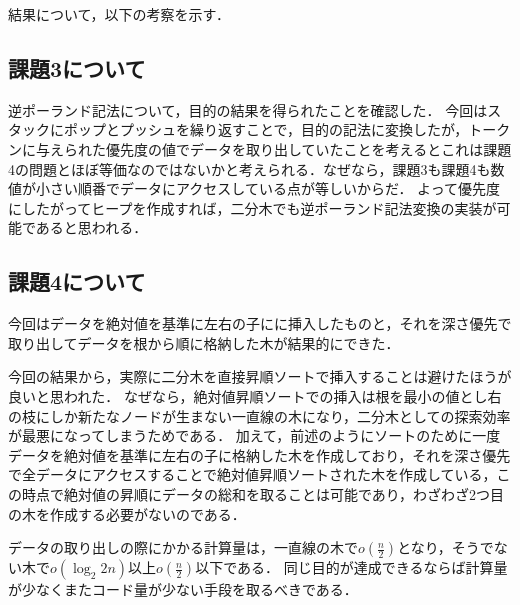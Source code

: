 結果について，以下の考察を示す．

\subsection{課題3について}
逆ポーランド記法について，目的の結果を得られたことを確認した．
今回はスタックにポップとプッシュを繰り返すことで，目的の記法に変換したが，トークンに与えられた優先度の値でデータを取り出していたことを考えるとこれは課題4の問題とほぼ等価なのではないかと考えられる．なぜなら，課題3も課題4も数値が小さい順番でデータにアクセスしている点が等しいからだ．
よって優先度にしたがってヒープを作成すれば，二分木でも逆ポーランド記法変換の実装が可能であると思われる．

\subsection{課題4について}

今回はデータを絶対値を基準に左右の子にに挿入したものと，それを深さ優先で取り出してデータを根から順に格納した木が結果的にできた．

今回の結果から，実際に二分木を直接昇順ソートで挿入することは避けたほうが良いと思われた．
なぜなら，絶対値昇順ソートでの挿入は根を最小の値とし右の枝にしか新たなノードが生まない一直線の木になり，二分木としての探索効率が最悪になってしまうためである．
加えて，前述のようにソートのために一度データを絶対値を基準に左右の子に格納した木を作成しており，それを深さ優先で全データにアクセスすることで絶対値昇順ソートされた木を作成している，この時点で絶対値の昇順にデータの総和を取ることは可能であり，わざわざ2つ目の木を作成する必要がないのである．

データの取り出しの際にかかる計算量は，一直線の木で\(o(\frac{n}{2})\)となり，そうでない木で\(o(\log_2 2n)\)以上\(o(\frac{n}{2})\)以下である．
同じ目的が達成できるならば計算量が少なくまたコード量が少ない手段を取るべきである．








